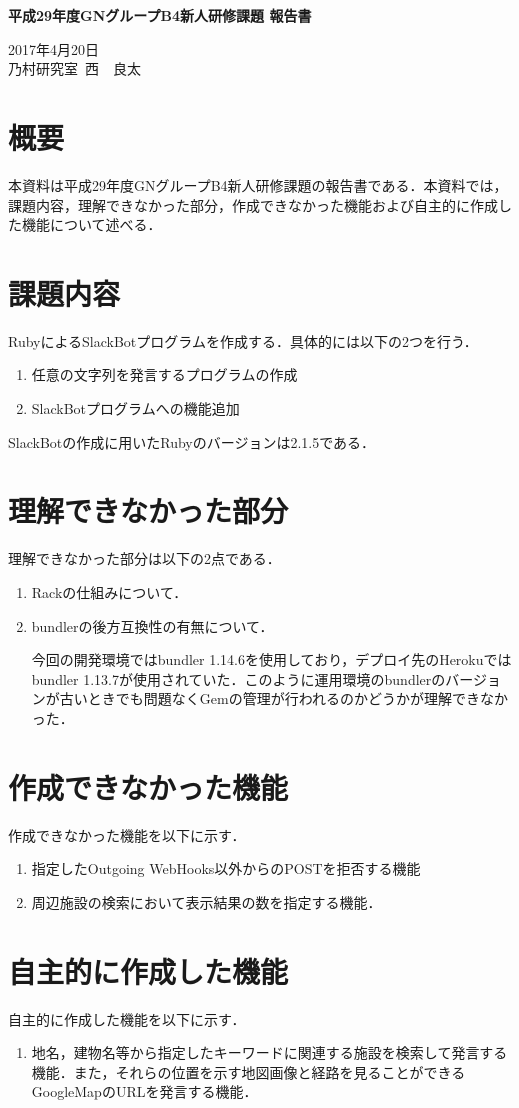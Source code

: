 \documentclass[fleqn, 14pt]{extarticlej}
\begin{document}
\begin{center}
{\Large {\bf 平成29年度GNグループB4新人研修課題 報告書}}

\end{center}

\begin{flushright}
  2017年4月20日\\
  
  乃村研究室\ 西　良太
\end{flushright}

\section{概要}
本資料は平成29年度GNグループB4新人研修課題の報告書である．本資料では，課題内容，理解できなかった部分，作成できなかった機能および自主的に作成した機能について述べる．

\section{課題内容}
RubyによるSlackBotプログラムを作成する．具体的には以下の2つを行う．

\begin{enumerate}
\item 任意の文字列を発言するプログラムの作成
\item SlackBotプログラムへの機能追加
\end{enumerate}

SlackBotの作成に用いたRubyのバージョンは2.1.5である．

\section{理解できなかった部分}
理解できなかった部分は以下の2点である．

\begin{enumerate}
\item Rackの仕組みについて．
\item bundlerの後方互換性の有無について．

  今回の開発環境ではbundler 1.14.6を使用しており，デプロイ先のHerokuではbundler 1.13.7が使用されていた．このように運用環境のbundlerのバージョンが古いときでも問題なくGemの管理が行われるのかどうかが理解できなかった．
\end{enumerate}

\section{作成できなかった機能}
作成できなかった機能を以下に示す．

\begin{enumerate}
\item 指定したOutgoing WebHooks以外からのPOSTを拒否する機能
\item 周辺施設の検索において表示結果の数を指定する機能．
\end{enumerate}

\section{自主的に作成した機能}
自主的に作成した機能を以下に示す．

\begin{enumerate}
\item 地名，建物名等から指定したキーワードに関連する施設を検索して発言する機能．また，それらの位置を示す地図画像と経路を見ることができるGoogleMapのURLを発言する機能．
\end{enumerate}
\end{document}
